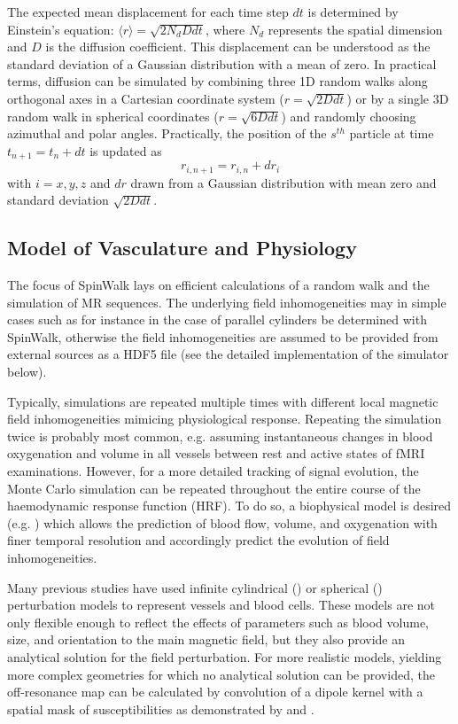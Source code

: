 The expected mean displacement for each time step \( dt \) is determined by Einstein’s equation: \( \langle r \rangle = \sqrt{2N_{d}Ddt} \), where \( N_{d} \) represents the spatial dimension and \( D \) is the diffusion coefficient. This displacement can be understood as the standard deviation of a Gaussian distribution with a mean of zero. In practical terms, diffusion can be simulated by combining three 1D random walks along orthogonal axes in a Cartesian coordinate system (\( r = \sqrt{2Ddt} \)) or by a single 3D random walk in spherical coordinates (\( r = \sqrt{6Ddt} \)) and randomly choosing azimuthal and polar angles. Practically, the position of the $s^{th}$ particle at time $t_{n+1} = t_n + dt$ is updated as 
\begin{equation}
r_{i, n+1} = r_{i, n} + dr_i
\end{equation}
with $i = x, y, z$ and $dr$ drawn from a Gaussian distribution with mean zero and standard deviation $\sqrt{2Ddt}$.

\subsection*{Model of Vasculature and Physiology}
The focus of SpinWalk lays on efficient calculations of a random walk and the simulation of MR sequences. The underlying field inhomogeneities may in simple cases such as for instance in the case of parallel cylinders be determined with SpinWalk, otherwise the field inhomogeneities are assumed to be provided from external sources as a HDF5 file (see the detailed implementation of the simulator below).

Typically, simulations are repeated multiple times with different local magnetic field inhomogeneities mimicing physiological response. Repeating the simulation twice is probably most common, e.g. assuming instantaneous changes in blood oxygenation and volume in all vessels between rest and active states of fMRI examinations. However, for a more detailed tracking of signal evolution, the Monte Carlo simulation can be repeated throughout the entire course of the haemodynamic response function (HRF). To do so, a biophysical model is desired (e.g. \cite{karch1999three, linninger2019mathematical, baez2023mechanistic, hartung2022simulated}) which allows the prediction of blood flow, volume, and oxygenation with finer temporal resolution and accordingly predict the evolution of field inhomogeneities.

Many previous studies have used inﬁnite cylindrical (\cite{khajehim2017investigating, baez2017impact}) or spherical (\cite{scheffler2019bold, weisskoff1994microscopic, bieri2007effect}) perturbation models to represent vessels and blood cells. These models are not only flexible enough to reflect the effects of parameters such as blood volume, size, and orientation to the main magnetic field, but they also provide an analytical solution for the field perturbation. For more realistic models, yielding more complex geometries for which no analytical solution can be provided, the off-resonance map can be calculated by convolution of a dipole kernel with a spatial mask of susceptibilities as demonstrated by \cite{pathak2008novel} and \cite{gagnon2015quantifying}.


